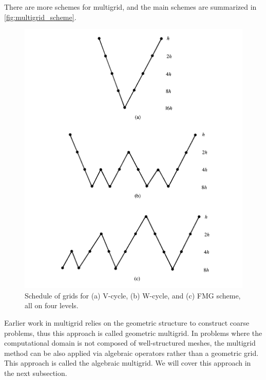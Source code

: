 There are more schemes for multigrid, and the main schemes are summarized in \autoref{fig:multigrid_scheme}.
\begin{figure}
    \centering
    \includegraphics[width=\linewidth]{figures/multigrid_scheme.png}
    \caption{Schedule of grids for (a) V-cycle, (b) W-cycle, and (c) FMG scheme,
all on four levels. \citep{10.5555/357695}}
    \label{fig:multigrid_scheme}
\end{figure}

Earlier work in multigrid relies on the geometric structure to construct coarse problems, thus this approach is called geometric multigrid.  In problems where the computational domain is not composed of well-structured meshes, the multigrid method can be also applied via algebraic operators rather than a geometric grid.  This approach is called the algebraic multigrid. We will cover this approach in the next subsection.

